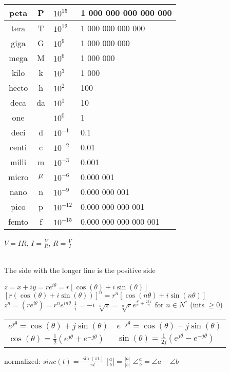\documentclass[12pt]{article}
\begin{document}
\begin{spacing}{0.8}
\begin{multicols*}{2}
\begin{flushleft}
\begin{outline}[longenum]
 \\
{\footnotesize
\begin{tabular}{|c c l l|}                                   \hline
peta  & P     & $10^{ 15}$ & \hfill 1 000 000 000 000 000 \\ \hline
tera  & T     & $10^{ 12}$ & \hfill     1 000 000 000 000 \\ \hline
giga  & G     & $10^{  9}$ & \hfill         1 000 000 000 \\ \hline
mega  & M     & $10^{  6}$ & \hfill             1 000 000 \\ \hline
kilo  & k     & $10^{  3}$ & \hfill                 1 000 \\ \hline
hecto & h     & $10^{  2}$ & \hfill                   100 \\ \hline
deca  & da    & $10^{  1}$ & \hfill                    10 \\ \hline
one   &       & $10^{ 0 }$ & \hfill       1 \hfill \hfill \\ \hline
deci  & d     & $10^{- 1}$ & 0.1                          \\ \hline
centi & c     & $10^{- 2}$ & 0.01                         \\ \hline
milli & m     & $10^{- 3}$ & 0.001                        \\ \hline
micro & $\mu$ & $10^{- 6}$ & 0.000 001                    \\ \hline
nano  & n     & $10^{- 9}$ & 0.000 000 001                \\ \hline
pico  & p     & $10^{-12}$ & 0.000 000 000 001            \\ \hline
femto & f     & $10^{-15}$ & 0.000 000 000 000 001        \\ \hline
\end{tabular}
}

  $V = IR$,
  \quad $I = \frac{V}{R}$,
  \quad $R = \frac{V}{I}$

\\ The side with the longer line is the positive side

  \1 $z = x+iy = re^{i\theta} = r[\cos(\theta)+i\sin(\theta)]$
  \1 $[r(\cos(\theta)+i\sin(\theta))]^n = r^n[\cos(n\theta)+i\sin(n\theta)]$
  \1 $z^n = (re^{i\theta}) = r^ne^{in\theta}$
  \1 $\frac{1}{i}=-i$
  \1 $\sqrt[n]{z} = \sqrt[n]{r}e^{\frac{\theta}{n}+\frac{2k\pi}{n}}$ for $n\in N^*$ (ints $\geq0$)
  \1\begin{tabular}{l|l}
  $e^{j\theta} = \cos(\theta) + j\sin(\theta)$
  &
  $e^{-j\theta} = \cos(\theta) - j\sin(\theta)$
  \\
  $\cos(\theta) = \frac{1}{2}(e^{j\theta} + e^{-j\theta})$
  &
  $\sin(\theta) = \frac{1}{2j}(e^{j\theta} - e^{-j\theta})$
  \\
  \end{tabular}
  \1 normalized: $sinc(t) = \frac{\sin(\pi t)}{\pi t}$
  \1 $|\frac{a}{b}| = \frac{|a|}{|b|}$
  \hfill $\angle\frac{a}{b} = \angle{a} - \angle{b}$


\end{outline}
\end{flushleft}
\end{multicols*}
\end{spacing}
\end{document}
